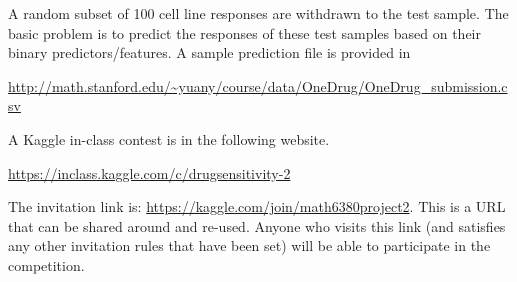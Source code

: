 \documentclass[11pt]{article}
\begin{document}
A random subset of 100 cell line responses are withdrawn to the test sample. The basic problem is to predict the responses of these test samples based on their binary predictors/features. A sample prediction file is provided in 
\begin{center}
\url{http://math.stanford.edu/~yuany/course/data/OneDrug/OneDrug_submission.csv}
\end{center}

A Kaggle in-class contest is in the following website. 
\begin{center}
\url{https://inclass.kaggle.com/c/drugsensitivity-2}
\end{center}
The invitation link is: \url{https://kaggle.com/join/math6380project2}. This is a URL that can be shared around and re-used.
Anyone who visits this link (and satisfies any other invitation rules that have been set)
will be able to participate in the competition.
%
%
%
%
%
%
%
%
\end{document}
